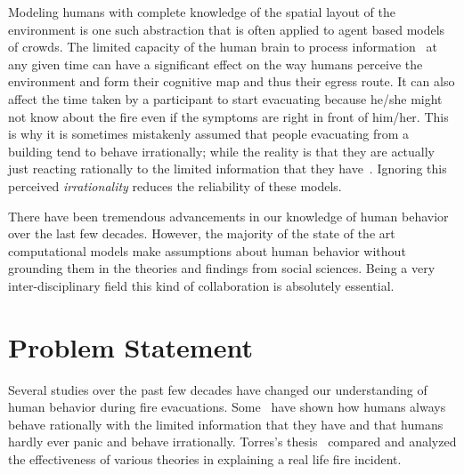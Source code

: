 Modeling humans with complete knowledge of the spatial layout of the environment is one such abstraction that is often applied to agent based models of crowds. The limited capacity of the human brain to process information~\cite{Miller:1956tr} at any given time can have a significant effect on the way humans perceive the environment and form their cognitive map and thus their egress route. It can also affect the time taken by a participant to start evacuating because he/she might not know about the fire even if the symptoms are right in front of him/her. This is why it is sometimes mistakenly assumed that people evacuating from a building tend to behave irrationally; while the reality is that they are actually just reacting rationally to the limited information that they have~\cite{Kobes:2009jx,Schadschneider:2008cz,Reicher:2008ep,Torres:2010tj,Paulsen:1984ti,Sime:1983uy}. Ignoring this perceived \emph{irrationality} reduces the reliability of these models.







There have been tremendous advancements in our knowledge of human behavior over the last few decades. However, the majority of the state of the art computational models make assumptions about human behavior without grounding them in the theories and findings from social sciences. Being a very inter-disciplinary field this kind of collaboration is absolutely essential.

\section{Problem Statement}
\label{Intro:ProblemStatement}

Several studies over the past few decades have changed our understanding of human behavior during fire evacuations. Some~\cite{Kobes:2009jx,Schadschneider:2008cz,Reicher:2008ep,Torres:2010tj,Paulsen:1984ti,Sime:1983uy} have shown how humans always behave rationally with the limited information that they have and that humans hardly ever panic and behave irrationally. Torres's thesis~\cite{Torres:2010tj} compared and analyzed the effectiveness of various theories in explaining a real life fire incident.

